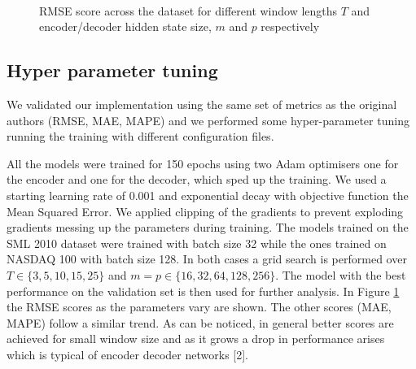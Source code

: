 \documentclass{article}
\begin{document}
\newpage

\begin{figure}[h]
  \centering
   \\
  \caption{RMSE score across the dataset for different
   window lengths $T$ and encoder/decoder hidden state size,
   $m$ and $p$ respectively}
  \label{fig:hype}
\end{figure}

\subsection{Hyper parameter tuning}

We validated our implementation using the same set of metrics as the original
authors (RMSE, MAE, MAPE) and we performed some hyper-parameter tuning running
the training with
different configuration files.

All the models were trained for 150 epochs using
two Adam optimisers one for the encoder and one for the decoder, which sped up
the training. We used a starting learning rate of 0.001 and exponential decay
with
objective function the Mean Squared Error. We applied clipping of the gradients
to prevent exploding gradients messing up the parameters during training.
The models trained on the SML 2010 dataset were trained with batch size 32 while
the ones trained on NASDAQ 100 with batch size 128. In both cases a grid search
is performed over $T \in \{3, 5, 10, 15, 25\}$ and $m = p \in \{16, 32, 64,
128, 256\}$.
The model with the best performance on the validation set is then used for
further analysis.
In Figure \ref{fig:hype} the RMSE scores as the parameters vary are shown. The
other scores (MAE, MAPE) follow a similar trend. As can be noticed, in general
better
scores are achieved for small window size and as it grows a drop in performance
arises
which is typical of encoder decoder networks [2].
\end{document}
